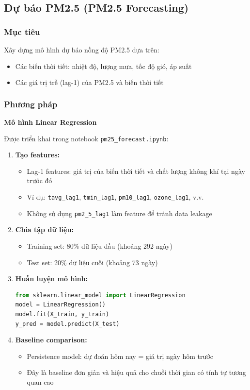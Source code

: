 \documentclass[12pt,a4paper]{article}
\begin{document}
\subsection{Dự báo PM2.5 (PM2.5 Forecasting)}

\subsubsection{Mục tiêu}
Xây dựng mô hình dự báo nồng độ PM2.5 dựa trên:
\begin{itemize}
    \item Các biến thời tiết: nhiệt độ, lượng mưa, tốc độ gió, áp suất
    \item Các giá trị trễ (lag-1) của PM2.5 và biến thời tiết
\end{itemize}

\subsubsection{Phương pháp}
\textbf{Mô hình Linear Regression}

Được triển khai trong notebook \texttt{pm25\_forecast.ipynb}:

\begin{enumerate}
    \item \textbf{Tạo features:}
    \begin{itemize}
        \item Lag-1 features: giá trị của biến thời tiết và chất lượng không khí tại ngày trước đó
        \item Ví dụ: \texttt{tavg\_lag1}, \texttt{tmin\_lag1}, \texttt{pm10\_lag1}, \texttt{ozone\_lag1}, v.v.
        \item Không sử dụng \texttt{pm2\_5\_lag1} làm feature để tránh data leakage
    \end{itemize}
    
    \item \textbf{Chia tập dữ liệu:}
    \begin{itemize}
        \item Training set: 80\% dữ liệu đầu (khoảng 292 ngày)
        \item Test set: 20\% dữ liệu cuối (khoảng 73 ngày)
    \end{itemize}
    
    \item \textbf{Huấn luyện mô hình:}
    \begin{lstlisting}[language=Python]
from sklearn.linear_model import LinearRegression
model = LinearRegression()
model.fit(X_train, y_train)
y_pred = model.predict(X_test)
    \end{lstlisting}
    
    \item \textbf{Baseline comparison:}
    \begin{itemize}
        \item Persistence model: dự đoán hôm nay = giá trị ngày hôm trước
        \item Đây là baseline đơn giản và hiệu quả cho chuỗi thời gian có tính tự tương quan cao
    \end{itemize}
\end{enumerate}
\end{document}
